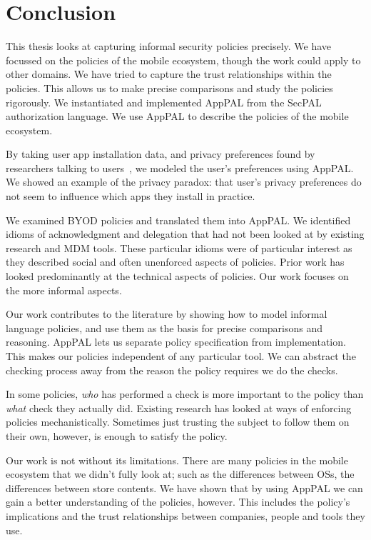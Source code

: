 \documentclass[thesis.tex]{subfiles}
\begin{document}
\chapter{Conclusion}

This thesis looks at capturing informal security policies precisely. We have
focussed on the policies of the mobile ecosystem, though the work could apply to
other domains. We have tried to capture the trust relationships within the
policies. This allows us to make precise comparisons and study the policies
rigorously. We instantiated and implemented AppPAL from the SecPAL authorization
language. We use AppPAL to describe the policies of the mobile ecosystem.

By taking user app installation data, and privacy
preferences found by researchers talking to users~\cite{lin_modeling_2014},
we modeled the user's preferences using AppPAL. We showed an example of the
privacy paradox: that user's privacy preferences do not seem to influence which
apps they install in practice.

We examined BYOD policies and
translated them into AppPAL. We identified idioms of
acknowledgment and delegation that 
had not been looked at by existing research and \ac{MDM} tools. These particular
idioms were of particular interest as they described social and often unenforced
aspects of policies. Prior work has looked predominantly at
the technical aspects of policies.   Our work focuses on the more informal aspects.

Our work contributes to the literature by showing how to model informal language policies,
and use them as the basis for precise comparisons and reasoning.
AppPAL lets us separate policy specification from implementation. This makes
our policies independent of any particular tool. We can abstract the checking
process away from the reason the policy requires we do the checks.

In some policies, \emph{who} has performed a
check is more important to the policy than \emph{what} check
they actually did. Existing research has looked at ways of enforcing
policies mechanistically. Sometimes just trusting the subject to follow them
on their own, however, is enough to satisfy the policy. 

Our work is not without its limitations. There are many policies in the mobile
ecosystem that we didn't fully look at; such as the differences between OSs, the
differences between store contents. We have shown that by using AppPAL we can
gain a better understanding of the policies, however. This includes the policy's
implications and the trust relationships between companies, people and tools
they use.
\end{document}
